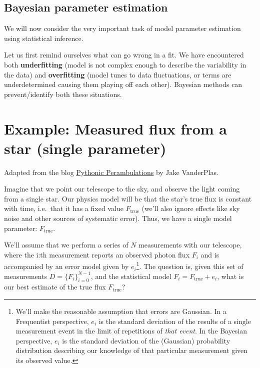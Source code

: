 \documentclass[%
oneside,                 %
final,                   %
10pt]{article}
\newenvironment{block_mdfboxadmon}[1][]{
\begin{block_mdfboxmdframed}[frametitle=#1]
}
{
\end{block_mdfboxmdframed}
}
\begin{document}
\subsection{Bayesian parameter estimation}

\begin{block_mdfboxadmon}[]
We will now consider the very important task of model parameter estimation using statistical inference. 

Let us first remind ourselves what can go wrong in a fit. We have encountered both \textbf{underfitting} (model is not complex enough to describe the variability in the data) and \textbf{overfitting} (model tunes to data fluctuations, or terms are underdetermined causing them playing off each other). Bayesian methods can prevent/identify both these situations.
\end{block_mdfboxadmon} %



\section{Example: Measured flux from a star (single parameter)}
Adapted from the blog \href{{http://jakevdp.github.io}}{Pythonic Perambulations} by Jake VanderPlas.

Imagine that we point our telescope to the sky, and observe the light coming from a single star. Our physics model will be that the star's true flux is constant with time, i.e.~that  it has a fixed value $F_\mathrm{true}$ (we'll also ignore effects like sky noise and other sources of systematic error). Thus, we have a single model parameter: $F_\mathrm{true}$.

We'll assume that we perform a series of $N$ measurements with our telescope, where the i:th measurement reports an observed photon flux $F_i$ and is accompanied by an error model given by $e_i$\footnote{We'll make the reasonable assumption that errors are Gaussian. In a Frequentist perspective, $e_i$ is the standard deviation of the results of a single measurement event in the limit of repetitions of \emph{that event}. In the Bayesian perspective, $e_i$ is the standard deviation of the (Gaussian) probability distribution describing our knowledge of that particular measurement given its observed value.}.
The question is, given this set of measurements $D = \{F_i\}_{i=0}^{N-1}$, and the statistical model $F_i = F_\mathrm{true} + e_i$, what is our best estimate of the true flux $F_\mathrm{true}$?
\end{document}
